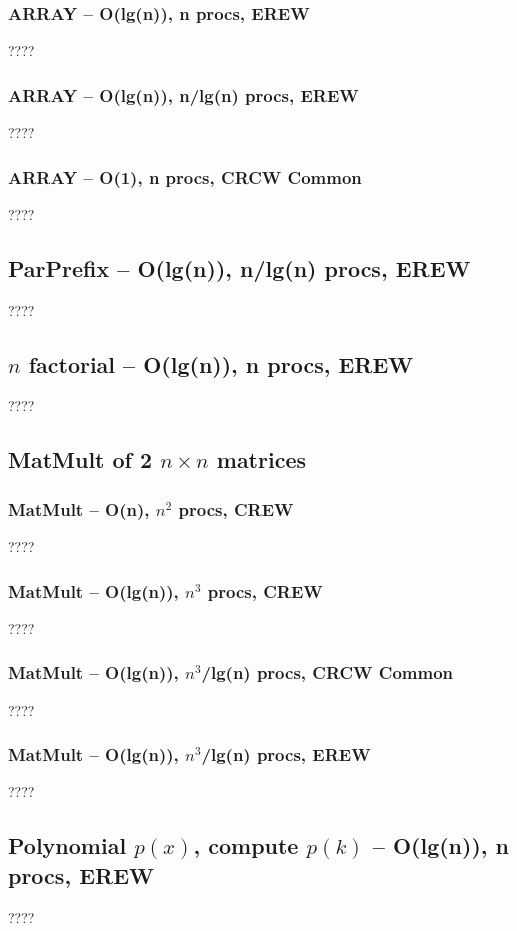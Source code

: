 \documentclass[12pt]{article}
\begin{document}
\subsubsection{ARRAY -- O(lg(n)), n procs, EREW}
????
\subsubsection{ARRAY -- O(lg(n)), n/lg(n) procs, EREW}
????
\subsubsection{ARRAY -- O(1), n procs, CRCW Common}
????


\subsection{ParPrefix -- O(lg(n)), n/lg(n) procs, EREW}
????


\subsection{$n$ factorial -- O(lg(n)), n procs, EREW}
????



\subsection{MatMult of 2 $n\times n$ matrices}
\subsubsection{MatMult -- O(n), $n^2$ procs, CREW}
????
\subsubsection{MatMult -- O(lg(n)), $n^3$ procs, CREW}
????
\subsubsection{MatMult -- O(lg(n)), $n^3$/lg(n) procs, CRCW Common}
????
\subsubsection{MatMult -- O(lg(n)), $n^3$/lg(n) procs, EREW}
????


\subsection{Polynomial $p(x)$, compute $p(k)$ -- O(lg(n)), n procs, EREW}
????
\end{document}
